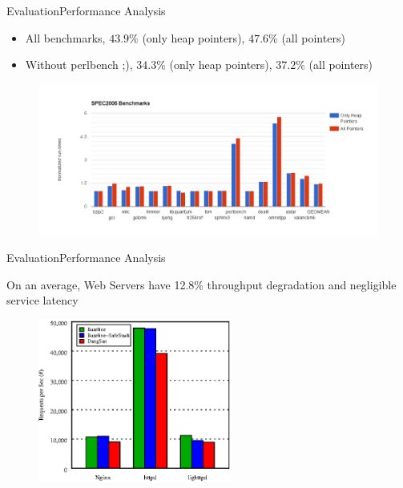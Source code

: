 \documentclass{beamer}
\begin{document}
\begin{frame}{Evaluation}{Performance Analysis}
\begin{block}{}
\begin{itemize}
\item All benchmarks, $43.9\%$ (only heap pointers), $47.6\%$ (all pointers)
\item Without perlbench ;), $34.3\%$ (only heap pointers), $37.2\%$ (all pointers)
\end{itemize}  
\end{block}

\begin{figure}[h]
	\centering
	\includegraphics[width=4.5in]{plots/spec_graph.png} 
\end{figure}
\end{frame}

\begin{frame}{Evaluation}{Performance Analysis}
\begin{block}{}
On an average, Web Servers have 12.8\% throughput degradation and negligible service latency
\end{block}
\begin{figure}[h]
	\centering
	\includegraphics[width=2.5in]{Tables/server_perf.eps} 
\end{figure}
\end{frame}
\end{document}
